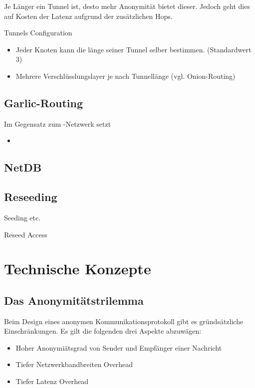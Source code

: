 Je Länger ein Tunnel ist, desto mehr Anonymität bietet dieser.
Jedoch geht dies auf Kosten der Latenz aufgrund der zusätzlichen Hops.

Tunnels Configuration
\cite{noauthor_i2p_nodate-3}

\begin{itemize}
    \item Jeder Knoten kann die länge seiner Tunnel selber bestimmen. (Standardwert 3)
    \item Mehrere Verschlüsslungslayer je nach Tunnellänge (vgl. Onion-Routing)
\end{itemize}

\subsection{Garlic-Routing}

Im Gegensatz zum -Netzwerk setzt

\begin{itemize}
    \item
\end{itemize}

\subsection{NetDB}

\subsection{Reseeding}

Seeding etc.

Reseed Access
\cite{noauthor_i2p_nodate-7}


\section{Technische Konzepte}
\label{sec:technischeKonzepte}

\subsection{Das Anonymitätstrilemma}\label{sec:anonymitytrilemma}

Beim Design eines anonymen Kommunikationsprotokoll gibt es gründsätzliche Einschränkungen. Es gilt die folgenden drei Aspekte abzuwägen:

\begin{itemize}
    \item Hoher Anonymiätsgrad von Sender und Empfänger einer Nachricht
    \item Tiefer Netzwerkbandbreiten Overhead
    \item Tiefer Latenz Overhead
\end{itemize}

